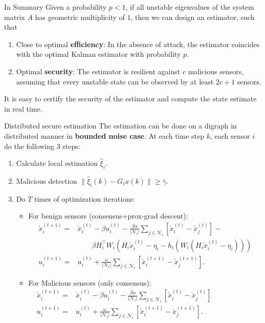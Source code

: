 \documentclass[10pt]{beamer}
\newcommand{\Nc}{{\mathcal N}}
\newcommand{\cx}{{\check{x}}}
\begin{document}
\begin{frame}{In Summary}
  Given a probability $p<1$, if all unstable eigenvalues of the system matrix $A$ has geometric multiplicity of $1$, then we can design an estimator, such that
  \begin{enumerate}
    \item Close to optimal {\bf efficiency}: In the absence of attack, the estimator coincides with the optimal Kalman estimator with probability $p$.
    \item Optimal {\bf security}: The estimator is resilient against $c$ malicious sensors, assuming that every unstable state can be observed by at least $2c+1$ sensors.
  \end{enumerate}
  It is easy to certify the security of the estimator and compute the state estimate in real time. 
\end{frame}

\begin{frame}{Distributed secure estimation}
	The estimation can be done on a digraph in distributed manner in \textbf{bounded noise case}. At each time step $k$, each sensor $i$ do the following 3 steps:
	\begin{enumerate}
		\item Calculate local estimation $\hat{\xi}_i$.
		\item Malicious detection $\|\hat{\xi}_i(k)-G_i x(k)\|\geq \bar{\gamma}$.
		\item Do $T$ times of optimization iterations:
		\begin{itemize}
			\item For benign sensors (consensus+prox-grad descent):
			\begin{align*}
				\cx_i^{(t+1)}=& \cx_i^{(t)}-\beta u_i^{(t)}-\frac{\beta \alpha}{|\Nc_i|}\sum_{j\in\Nc_i} \left[\cx_i^{(t)} -\cx_j^{(t)}\right] -\\
				&\qquad \beta H_i^\top W_i \left(H_i \cx_i^{(t)}-\eta_i -h_i(W_i(H_i\cx_i^{(t)}-\eta_i))\right) \\
				u_i^{(t+1)}=&u_i^{(t)}+\frac{\omega}{|\Nc_i|}\sum_{j\in\Nc_i} \left[\cx_i^{(t+1)} -\cx_j^{(t+1)}\right]. 
			\end{align*}
		
			\item For Malicious sensors (only consensus): 
			\begin{align*}
				\cx_i^{(t+1)}=& \cx_i^{(t)}-\beta u_i^{(t)}-\frac{\beta \alpha}{|\Nc_i|}\sum_{j\in\Nc_i} \left[\cx_i^{(t)} -\cx_j^{(t)}\right]\\
				u_i^{(t+1)}=&u_i^{(t)}+\frac{\omega}{|\Nc_i|}\sum_{j\in\Nc_i} \left[\cx_i^{(t+1)} -\cx_j^{(t+1)}\right]. \hspace{85pt}
			\end{align*}
	\end{itemize}
	\end{enumerate}

\end{frame}
\end{document}
